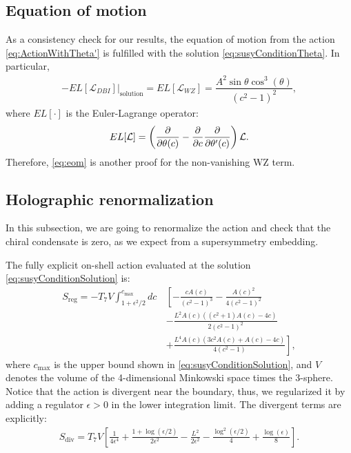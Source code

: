 
\subsection{Equation of motion}

As a consistency check for our results, the equation of motion from the action \eqref{eq:ActionWithTheta'} is fulfilled with the solution \eqref{eq:susyConditionTheta}. In particular, 
\begin{align}\label{eq:eom}
-\left.EL[\mathcal{L}_{DBI}]\right|_\text{solution} = EL[\mathcal{L}_{WZ}] = \dfrac{A^2 \sin\theta \cos^3(\theta)}{\left(c^2-1\right)^2},
\end{align}
where $EL[\cdot]$ is the Euler-Lagrange operator:
\begin{equation}
 EL[\mathcal{L}] = 
 \left(\dfrac{\partial }{\partial \theta(c)} -\dfrac{\partial }{\partial c}  \dfrac{\partial }{\partial \theta'(c)} \right) \mathcal{L}.
\end{equation}
Therefore, \eqref{eq:eom} is another proof for the non-vanishing WZ term.



\subsection{Holographic renormalization}
In this subsection, we are going to renormalize the action and check that the chiral condensate is zero, as we expect from a supersymmetry embedding.

The fully explicit on-shell action evaluated at the solution \eqref{eq:susyConditionSolution} is:
\begin{align}\label{eq:ActionAtSolution}
 S_\text{reg} = -T_7 V \int_{1 + \epsilon^2/2}^{c_\text{max}} d c \, 
 &\left[-\frac{c A(c)}{\left(c^2-1\right)^3} -\frac{A(c)^2}{4 \left(c^2-1\right)^2} \right. \nonumber\\
 &-\frac{L^2 A(c) \left(\left(c^2+1\right) A(c)-4 c\right)}{2 \left(c^2-1\right)^2} \nonumber\\
 &+\left.\frac{L^4 A(c) \left(3 c^2 A(c)+A(c)-4 c\right)}{4 \left(c^2-1\right)}\right],
\end{align}
where $c_\text{max}$ is the upper bound shown in \eqref{eq:susyConditionSolution}, and $V$ denotes the volume of the 4-dimensional Minkowski space times the 3-sphere. Notice that the action is divergent near the boundary, thus, we regularized it by adding a regulator $\epsilon>0$ in the lower integration limit. The divergent terms are explicitly:
\begin{align} \label{eq:Sdiv}
 S_\text{div} = T_7 V 
        \left[ \frac{1}{4 \epsilon ^4} +\frac{1+\log \left(\epsilon/2\right)}{2 \epsilon ^2}-\frac{L^2}{2 \epsilon ^2}-\frac{ \log ^2\left(\epsilon/2\right)}{4}+\frac{\log (\epsilon )}{8} \right].
\end{align}

